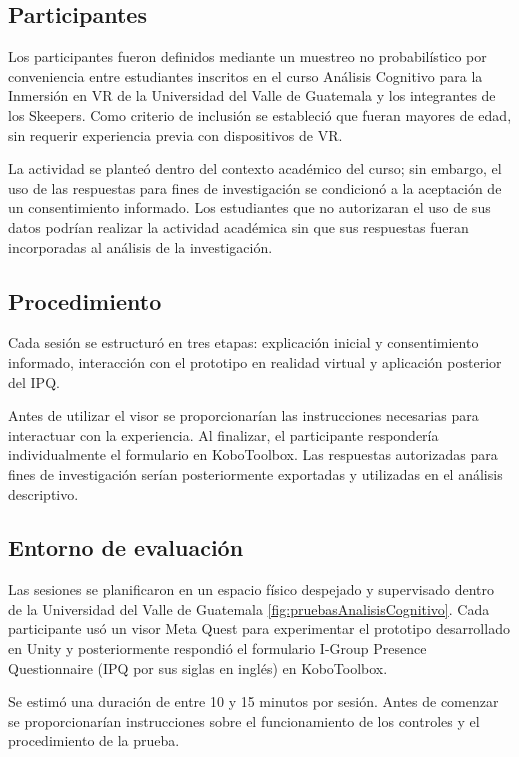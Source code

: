 \subsection{Participantes}
Los participantes fueron definidos mediante un muestreo no probabilístico por conveniencia entre estudiantes inscritos en el curso Análisis Cognitivo para la Inmersión en VR de la Universidad del Valle de Guatemala y los integrantes de los Skeepers. Como criterio de inclusión se estableció que fueran mayores de edad, sin requerir experiencia previa con dispositivos de VR.

La actividad se planteó dentro del contexto académico del curso; sin embargo, el uso de las respuestas para fines de investigación se condicionó a la aceptación de un consentimiento informado. Los estudiantes que no autorizaran el uso de sus datos podrían realizar la actividad académica sin que sus respuestas fueran incorporadas al análisis de la investigación.

\subsection{Procedimiento}
Cada sesión se estructuró en tres etapas: explicación inicial y consentimiento informado, interacción con el prototipo en realidad virtual y aplicación posterior del IPQ.

Antes de utilizar el visor se proporcionarían las instrucciones necesarias para interactuar con la experiencia. Al finalizar, el participante respondería individualmente el formulario en KoboToolbox. Las respuestas autorizadas para fines de investigación serían posteriormente exportadas y utilizadas en el análisis descriptivo.

\subsection{Entorno de evaluación}

Las sesiones se planificaron en un espacio físico despejado y supervisado dentro de la Universidad del Valle de Guatemala \ref{fig:pruebasAnalisisCognitivo}. Cada participante usó un visor Meta Quest para experimentar el prototipo desarrollado en Unity y posteriormente respondió el formulario I-Group Presence Questionnaire (IPQ por sus siglas en inglés) en KoboToolbox.

Se estimó una duración de entre 10 y 15 minutos por sesión. Antes de comenzar se proporcionarían instrucciones sobre el funcionamiento de los controles y el procedimiento de la prueba.

